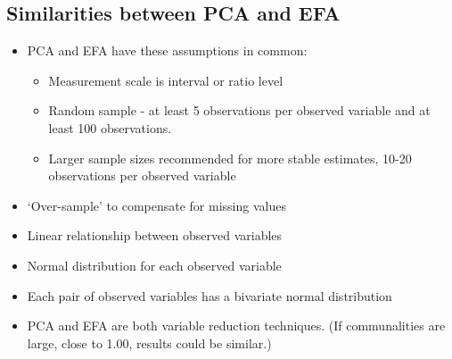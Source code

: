\subsection{Similarities between PCA and EFA}
\begin{itemize}
\item PCA and EFA have these assumptions in common:
\begin{itemize}
\item Measurement scale is interval or ratio level
\item Random sample - at least 5 observations per observed variable and at least 100 observations.
\item Larger sample sizes recommended for more stable estimates, 10-20 observations per observed variable
\end{itemize}
\item `Over-sample' to compensate for missing values
\item Linear relationship between observed variables
\item Normal distribution for each observed variable
\item Each pair of observed variables has a bivariate normal distribution
\item PCA and EFA are both variable reduction techniques. (If communalities are large, close to 1.00, results could be similar.)
\end{itemize}

